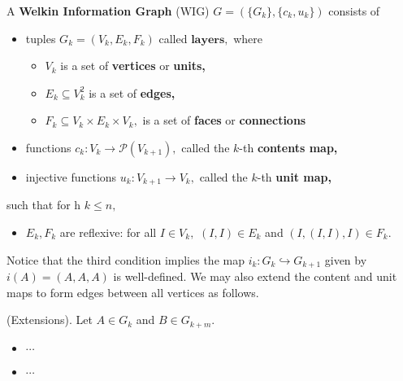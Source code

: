  \begin{definition} A \textbf{Welkin Information Graph} (WIG) $G = (\{G_{k}\}, \{c_{k}, u_{k}\})$ consists of
   \begin{itemize}
     \item tuples $G_{k} = (V_{k}, E_{k}, F_{k})$ called $\textbf{layers},$ where
           \begin{itemize}
             \item $V_{k}$ is a set of \textbf{vertices} or \textbf{units,}
             \item $E_{k} \subseteq V_{k}^{2}$ is a set of \textbf{edges,}
             \item $F_{k} \subseteq V_{k} \times E_{k} \times V_{k},$ is a set of \textbf{faces} or \textbf{connections}
           \end{itemize}
     \item functions $c_{k}: V_{k} \to \mathcal{P}(V_{k+1}),$ called the $k$-th \textbf{contents map,}
     \item injective functions $u_{k}: V_{k+1} \to V_{k},$ called the $k$-th \textbf{unit map,}
   \end{itemize}
   such that for h $k \leq n,$
    \begin{itemize}
    \item $E_{k}, F_{k}$ are reflexive: for all $I \in V_{k},$
            $(I, I) \in E_{k}$ and $(I, (I, I), I) \in F_{k}.$
    \end{itemize}

    \end{definition}

    Notice that the third condition implies the map $i_{k}: G_{k} \hookrightarrow G_{k+1}$ given by $i(A) = (A, A, A)$ is well-defined. We may also extend the content and unit maps to form edges between all vertices as follows.
\begin{definition} (Extensions). Let $A \in G_{k}$ and $B \in G_{k+m}.$
    \begin{itemize}
      \item $\cdots$
      \item $\cdots$
    \end{itemize}
\end{definition}

